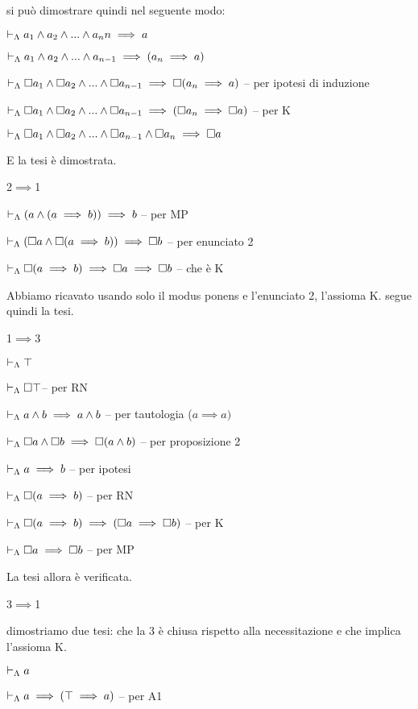 si può dimostrare quindi nel seguente modo:

$\vdash_{\Lambda}a_{1}\wedge a_{2}\wedge...\wedge a_{n}n\implies a$

$\vdash_{\Lambda}a_{1}\wedge a_{2}\wedge...\wedge a_{n-1}\implies(a_{n}\implies a)$

$\vdash_{\Lambda}\square a_{1}\wedge\square a_{2}\wedge...\wedge\square a_{n-1}\implies\square(a_{n}\implies a)$
-- per ipotesi di induzione

$\vdash_{\Lambda}\square a_{1}\wedge\square a_{2}\wedge...\wedge\square a_{n-1}\implies(\square a_{n}\implies\square a)$
-- per K

$\vdash_{\Lambda}\square a_{1}\wedge\square a_{2}\wedge...\wedge\square a_{n-1}\wedge\square a_{n}\implies\square a$

E la tesi è dimostrata.

2$\implies$1

$\vdash_{\Lambda}(a\wedge(a\implies b))\implies b$ -- per MP

$\vdash_{\Lambda}(\square a\wedge\square(a\implies b))\implies\square b$
-- per enunciato 2

$\vdash_{\Lambda}\square(a\implies b)\implies\square a\implies\square b$
-- che è K

Abbiamo ricavato usando solo il modus ponens e l'enunciato 2, l'assioma
K. segue quindi la tesi.

1$\implies3$

$\vdash_{\Lambda}\top$

$\vdash_{\Lambda}\square\top$-- per RN

$\vdash_{\Lambda}a\wedge b\implies a\wedge b$ -- per tautologia
($a\implies a)$

$\vdash_{\Lambda}\square a\wedge\square b\implies\square(a\wedge b)$ --
per proposizione 2

$\vdash_{\Lambda}a\implies b$ -- per ipotesi

$\vdash_{\Lambda}\square(a\implies b)$ -- per RN

$\vdash_{\Lambda}\square(a\implies b)\implies(\square a\implies\square b)$
-- per K

$\vdash_{\Lambda}\square a\implies\square b$ -- per MP

La tesi allora è verificata.

3$\implies$1

dimostriamo due tesi: che la 3 è chiusa rispetto alla necessitazione
e che implica l'assioma K.

$\vdash_{\Lambda}a$

$\vdash_{\Lambda}a\implies(\top\implies a)$ -- per A1

